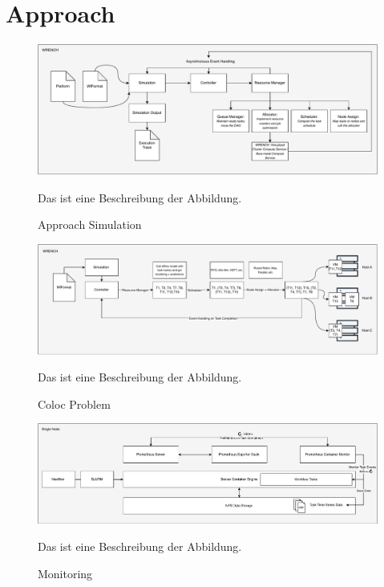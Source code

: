 \section{Approach}
\label{cha:approach}
\begin{figure}[H]
    \centering
    \includegraphics[scale=0.5]{fig/04/04-approach-sim.pdf}
    \caption{Approach Simulation}
    \label{fig:04-approach-sim}
    \tiny
    Das ist eine Beschreibung der Abbildung.
\end{figure}
\begin{figure}[H]
    \centering
    \includegraphics[scale=0.45]{fig/04/04-coloc-problem.pdf}
    \caption{Coloc Problem}
    \label{fig:04-coloc-problem}
    \tiny
    Das ist eine Beschreibung der Abbildung.
\end{figure}
\begin{figure}[H]
    \centering
    \includegraphics[scale=0.45]{fig/04/04-monitoring.pdf}
    \caption{Monitoring}
    \label{fig:04-monitoring}
    \tiny
    Das ist eine Beschreibung der Abbildung.
\end{figure}
